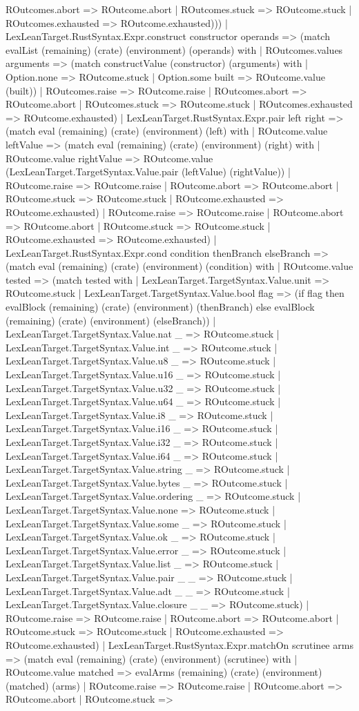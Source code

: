 \documentclass[11pt]{article}
\begin{document}
ROutcomes.abort => ROutcome.abort | ROutcomes.stuck => ROutcome.stuck | ROutcomes.exhausted => ROutcome.exhausted))) | LexLeanTarget.RustSyntax.Expr.construct constructor operands => (match evalList (remaining) (crate) (environment) (operands) with | ROutcomes.values arguments => (match constructValue (constructor) (arguments) with | Option.none => ROutcome.stuck | Option.some built => ROutcome.value (built)) | ROutcomes.raise => ROutcome.raise | ROutcomes.abort => ROutcome.abort | ROutcomes.stuck => ROutcome.stuck | ROutcomes.exhausted => ROutcome.exhausted) | LexLeanTarget.RustSyntax.Expr.pair left right => (match eval (remaining) (crate) (environment) (left) with | ROutcome.value leftValue => (match eval (remaining) (crate) (environment) (right) with | ROutcome.value rightValue => ROutcome.value (LexLeanTarget.TargetSyntax.Value.pair (leftValue) (rightValue)) | ROutcome.raise => ROutcome.raise | ROutcome.abort => ROutcome.abort | ROutcome.stuck => ROutcome.stuck | ROutcome.exhausted => ROutcome.exhausted) | ROutcome.raise => ROutcome.raise | ROutcome.abort => ROutcome.abort | ROutcome.stuck => ROutcome.stuck | ROutcome.exhausted => ROutcome.exhausted) | LexLeanTarget.RustSyntax.Expr.cond condition thenBranch elseBranch => (match eval (remaining) (crate) (environment) (condition) with | ROutcome.value tested => (match tested with | LexLeanTarget.TargetSyntax.Value.unit => ROutcome.stuck | LexLeanTarget.TargetSyntax.Value.bool flag => (if flag then evalBlock (remaining) (crate) (environment) (thenBranch) else evalBlock (remaining) (crate) (environment) (elseBranch)) | LexLeanTarget.TargetSyntax.Value.nat \_ => ROutcome.stuck | LexLeanTarget.TargetSyntax.Value.int \_ => ROutcome.stuck | LexLeanTarget.TargetSyntax.Value.u8 \_ => ROutcome.stuck | LexLeanTarget.TargetSyntax.Value.u16 \_ => ROutcome.stuck | LexLeanTarget.TargetSyntax.Value.u32 \_ => ROutcome.stuck | LexLeanTarget.TargetSyntax.Value.u64 \_ => ROutcome.stuck | LexLeanTarget.TargetSyntax.Value.i8 \_ => ROutcome.stuck | LexLeanTarget.TargetSyntax.Value.i16 \_ => ROutcome.stuck | LexLeanTarget.TargetSyntax.Value.i32 \_ => ROutcome.stuck | LexLeanTarget.TargetSyntax.Value.i64 \_ => ROutcome.stuck | LexLeanTarget.TargetSyntax.Value.string \_ => ROutcome.stuck | LexLeanTarget.TargetSyntax.Value.bytes \_ => ROutcome.stuck | LexLeanTarget.TargetSyntax.Value.ordering \_ => ROutcome.stuck | LexLeanTarget.TargetSyntax.Value.none => ROutcome.stuck | LexLeanTarget.TargetSyntax.Value.some \_ => ROutcome.stuck | LexLeanTarget.TargetSyntax.Value.ok \_ => ROutcome.stuck | LexLeanTarget.TargetSyntax.Value.error \_ => ROutcome.stuck | LexLeanTarget.TargetSyntax.Value.list \_ => ROutcome.stuck | LexLeanTarget.TargetSyntax.Value.pair \_ \_ => ROutcome.stuck | LexLeanTarget.TargetSyntax.Value.adt \_ \_ => ROutcome.stuck | LexLeanTarget.TargetSyntax.Value.closure \_ \_ => ROutcome.stuck) | ROutcome.raise => ROutcome.raise | ROutcome.abort => ROutcome.abort | ROutcome.stuck => ROutcome.stuck | ROutcome.exhausted => ROutcome.exhausted) | LexLeanTarget.RustSyntax.Expr.matchOn scrutinee arms => (match eval (remaining) (crate) (environment) (scrutinee) with | ROutcome.value matched => evalArms (remaining) (crate) (environment) (matched) (arms) | ROutcome.raise => ROutcome.raise | ROutcome.abort => ROutcome.abort | ROutcome.stuck => 
\end{document}

